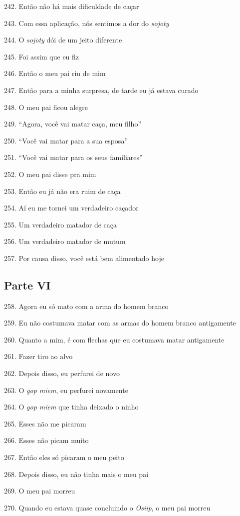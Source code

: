 242. Então não há mais dificuldade de caçar

243. Com essa aplicação, nós sentimos a dor do \emph{sojoty}

244. O \emph{sojoty} dói de um jeito diferente

245. Foi assim que eu fiz

246. Então o meu pai riu de mim

247. Então para a minha surpresa, de tarde eu já estava curado

248. O meu pai ficou alegre

249. ``Agora, você vai matar caça, meu filho''

250. ``Você vai matar para a sua esposa''

251. ``Você vai matar para os seus familiares''

252. O meu pai disse pra mim

253. Então eu já não era ruim de caça

254. Aí eu me tornei um verdadeiro caçador

255. Um verdadeiro matador de caça

256. Um verdadeiro matador de mutum

257. Por causa disso, você está bem alimentado hoje

\subsection{Parte VI}

258. Agora eu só mato com a arma do homem branco

259. Eu não costumava matar com as armas do homem branco antigamente

260. Quanto a mim, é com flechas que eu costumava matar antigamente

261. Fazer tiro ao alvo

262. Depois disso, eu perfurei de novo

263. O \emph{gop miem}, eu perfurei novamente

264. O \emph{gop miem} que tinha deixado o ninho

265. Esses não me picaram

266. Esses não picam muito

267. Então eles só picaram o meu peito

268. Depois disso, eu não tinha mais o meu pai

269. O meu pai morreu

270. Quando eu estava quase concluindo o \emph{Osiip}, o meu pai morreu

